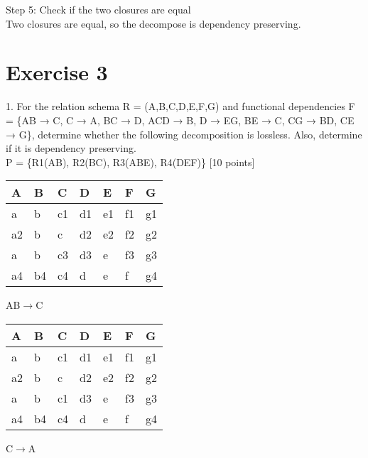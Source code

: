 \documentclass[]{article}
\begin{document}
	\noindent Step 5: Check if the two closures are equal   \\
	
	Two closures are equal, so the decompose is dependency preserving.  \\
	
	\section{Exercise 3}
	
	1. For the relation schema R = (A,B,C,D,E,F,G) and functional dependencies F = \{AB → C, C → A, BC → D, ACD → B, D → EG, BE → C, CG → BD, CE → G\}, determine whether the following decomposition is lossless. Also, determine if it is dependency preserving.  \\
	
	\noindent P = \{R1(AB), R2(BC), R3(ABE), R4(DEF)\} [10 points]  \\
	
	\begin{table}[H]
		\begin{tabular}{|l|l|l|l|l|l|l|}
			\hline
			A & B & C  & D  & E  & F  & G  \\ \hline
			a & b & c1 & d1 & e1 & f1 & g1 \\ \hline
			a2 & b & c & d2 & e2 & f2 & g2 \\ \hline
			a & b & c3 & d3 & e & f3 & g3 \\ \hline
			a4 & b4 & c4 & d & e & f & g4 \\ \hline
		\end{tabular}
	\end{table}

	AB$\rightarrow$C  \\
	
	\begin{table}[H]
		\begin{tabular}{|l|l|l|l|l|l|l|}
			\hline
			A & B & C  & D  & E  & F  & G  \\ \hline
			a & b & c1 & d1 & e1 & f1 & g1 \\ \hline
			a2 & b & c & d2 & e2 & f2 & g2 \\ \hline
			a & b & c1 & d3 & e & f3 & g3 \\ \hline
			a4 & b4 & c4 & d & e & f & g4 \\ \hline
		\end{tabular}
	\end{table}

	C$\rightarrow$A   \\
	
\end{document}
